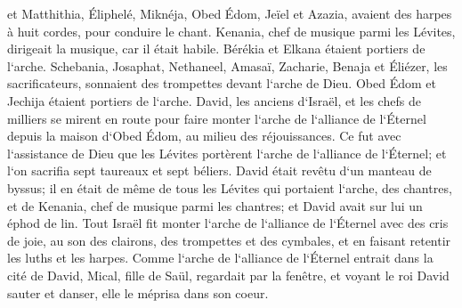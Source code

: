 \verse et Matthithia, Éliphelé, Miknéja, Obed Édom, Jeïel et Azazia, avaient des harpes à huit cordes, pour conduire le chant. 
\verse Kenania, chef de musique parmi les Lévites, dirigeait la musique, car il était habile. 
\verse Bérékia et Elkana étaient portiers de l`arche. 
\verse Schebania, Josaphat, Nethaneel, Amasaï, Zacharie, Benaja et Éliézer, les sacrificateurs, sonnaient des trompettes devant l`arche de Dieu. Obed Édom et Jechija étaient portiers de l`arche. 
\verse David, les anciens d`Israël, et les chefs de milliers se mirent en route pour faire monter l`arche de l`alliance de l`Éternel depuis la maison d`Obed Édom, au milieu des réjouissances. 
\verse Ce fut avec l`assistance de Dieu que les Lévites portèrent l`arche de l`alliance de l`Éternel; et l`on sacrifia sept taureaux et sept béliers. 
\verse David était revêtu d`un manteau de byssus; il en était de même de tous les Lévites qui portaient l`arche, des chantres, et de Kenania, chef de musique parmi les chantres; et David avait sur lui un éphod de lin. 
\verse Tout Israël fit monter l`arche de l`alliance de l`Éternel avec des cris de joie, au son des clairons, des trompettes et des cymbales, et en faisant retentir les luths et les harpes. 
\verse Comme l`arche de l`alliance de l`Éternel entrait dans la cité de David, Mical, fille de Saül, regardait par la fenêtre, et voyant le roi David sauter et danser, elle le méprisa dans son coeur. 

